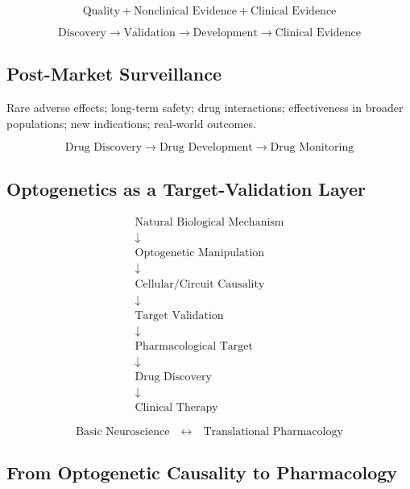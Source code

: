\documentclass[11pt]{article}
\begin{document}
\[
\text{Quality} + \text{Nonclinical Evidence} + \text{Clinical Evidence}
\]

\[
\boxed{
\text{Discovery} \rightarrow \text{Validation} \rightarrow
\text{Development} \rightarrow \text{Clinical Evidence}
}
\]

\subsection{Post-Market Surveillance}

Rare adverse effects; long-term safety; drug interactions;
effectiveness in broader populations; new indications;
real-world outcomes.

\[
\boxed{
\text{Drug Discovery} \rightarrow \text{Drug Development}
\rightarrow \text{Drug Monitoring}
}
\]

\subsection{Optogenetics as a Target-Validation Layer}

\begin{tcolorbox}[colback=SlatePurple!5,colframe=SlatePurple,
  title=\textbf{Optogenetics Within Drug Discovery},fonttitle=\bfseries]
\begin{center}
\[
\begin{array}{c}
\text{Natural Biological Mechanism}\\ \downarrow \\
\text{Optogenetic Manipulation}\\ \downarrow \\
\text{Cellular/Circuit Causality}\\ \downarrow \\
\text{Target Validation}\\ \downarrow \\
\text{Pharmacological Target}\\ \downarrow \\
\text{Drug Discovery}\\ \downarrow \\
\text{Clinical Therapy}
\end{array}
\]
\end{center}
\end{tcolorbox}

\[
\boxed{
\text{Basic Neuroscience}
\quad\longleftrightarrow\quad
\text{Translational Pharmacology}
}
\]

\subsection{From Optogenetic Causality to Pharmacology}
\end{document}
